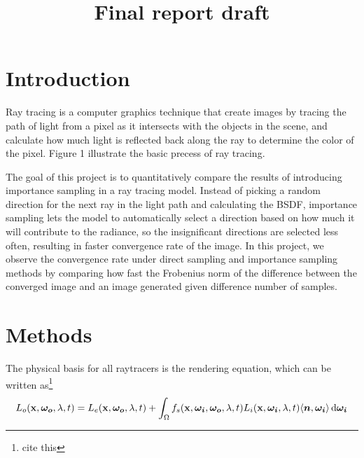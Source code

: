 \documentclass[12pt]{article}
\title{Final report draft}
\DeclarePairedDelimiter\ip{\langle }{\rangle}
\begin{document}
\maketitle
\begin{abstract}

\end{abstract}

\section{Introduction}
Ray tracing is a computer graphics technique that create images by tracing the path of light from a pixel as it intersects with the objects in the scene, and calculate how much light is reflected back along the ray to determine the color of the pixel. Figure 1 illustrate the basic precess of ray tracing.

The goal of this project is to quantitatively compare the results of introducing importance sampling in a ray tracing model. Instead of picking a random direction for the next ray in the light path and calculating the BSDF, importance sampling lets the model to automatically select a direction based on how much it will contribute to the radiance, so the insignificant directions are selected less often, resulting in faster convergence rate of the image. In this project, we observe the convergence rate under direct sampling and importance sampling methods by comparing how fast the Frobenius norm of the difference between the converged image and an image generated given difference number of samples.
    
\section{Methods}

The physical basis for all raytracers is the rendering equation, which can be written as\footnote{cite this}
\[L_{o}(\mathbf x, \bm {\omega_{o}}, \lambda, t) = L_{e}(\mathbf x, \bm{\omega_o}, \lambda, t) + \int_\Omega f_s(\mathbf x, \bm{\omega_i}, \bm{\omega_o}, \lambda, t)L_i(\mathbf x, \bm{\omega_i}, \lambda, t)\ip{\bm n, \bm{\omega_i}} \dif \bm{\omega_i}\]
\end{document}
